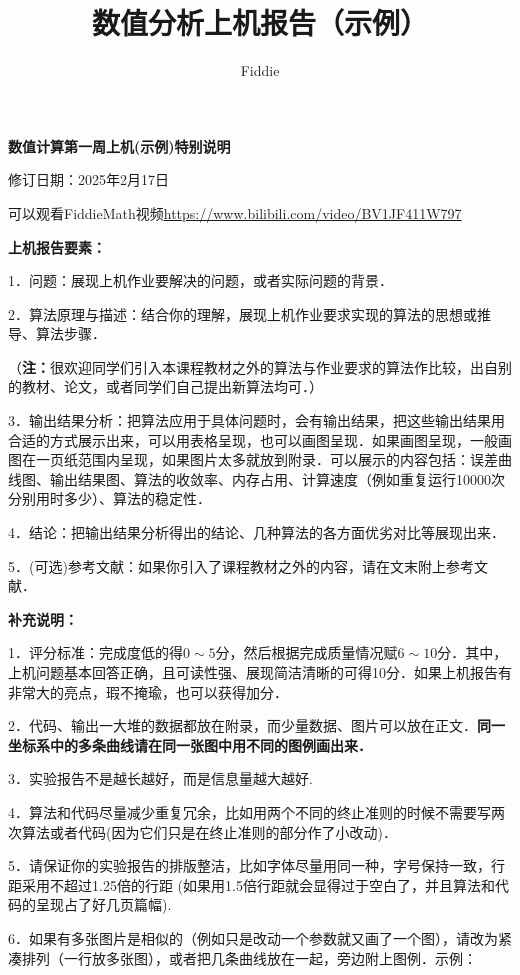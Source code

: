 \documentclass[UTF8,ctexart,a4paper,11pt,openany]{article}
\title{数值分析上机报告（示例）}
\author{Fiddie}
\theoremstyle{definition}
\newcommand*{\rmk}{\textbf{注：}}
\begin{document}
\begin{center}
{\huge \textbf{数值计算第一周上机(示例)特别说明}}

修订日期：2025年2月17日
\end{center}

可以观看FiddieMath视频\url{https://www.bilibili.com/video/BV1JF411W797}

\noindent \textbf{上机报告要素：}

1．问题：展现上机作业要解决的问题，或者实际问题的背景．

2．算法原理与描述：结合你的理解，展现上机作业要求实现的算法的思想或推导、算法步骤．

（\rmk 很欢迎同学们引入本课程教材之外的算法与作业要求的算法作比较，出自别的教材、论文，或者同学们自己提出新算法均可．）

3．输出结果分析：把算法应用于具体问题时，会有输出结果，把这些输出结果用合适的方式展示出来，可以用表格呈现，也可以画图呈现．如果画图呈现，一般画图在一页纸范围内呈现，如果图片太多就放到附录．可以展示的内容包括：误差曲线图、输出结果图、算法的收敛率、内存占用、计算速度（例如重复运行10000次分别用时多少）、算法的稳定性．

4．结论：把输出结果分析得出的结论、几种算法的各方面优劣对比等展现出来．

5．(可选)参考文献：如果你引入了课程教材之外的内容，请在文末附上参考文献．

\vspace{0.5cm}

\noindent \textbf{补充说明：}

1．评分标准：完成度低的得$0\sim 5$分，然后根据完成质量情况赋$6\sim 10$分．其中，上机问题基本回答正确，且可读性强、展现简洁清晰的可得10分．如果上机报告有非常大的亮点，瑕不掩瑜，也可以获得加分．

2．代码、输出一大堆的数据都放在附录，而少量数据、图片可以放在正文．\textbf{同一坐标系中的多条曲线请在同一张图中用不同的图例画出来．}

3．实验报告不是越长越好，而是信息量越大越好.

4．算法和代码尽量减少重复冗余，比如用两个不同的终止准则的时候不需要写两次算法或者代码(因为它们只是在终止准则的部分作了小改动)．

5．请保证你的实验报告的排版整洁，比如字体尽量用同一种，字号保持一致，行距采用不超过1.25倍的行距 (如果用1.5倍行距就会显得过于空白了，并且算法和代码的呈现占了好几页篇幅).

6．如果有多张图片是相似的（例如只是改动一个参数就又画了一个图），请改为紧凑排列（一行放多张图），或者把几条曲线放在一起，旁边附上图例．示例：\cite{MScaleDNN2020}
\end{document}
